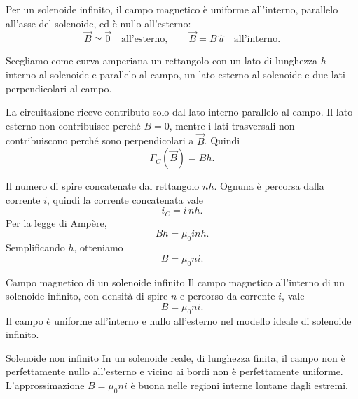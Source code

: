 \documentclass[a4paper]{article}
\begin{document}
Per un solenoide infinito, il campo magnetico è uniforme all'interno, parallelo all'asse del solenoide, ed è nullo all'esterno:
\[
    \vec{B}\simeq \vec{0}\quad \text{all'esterno},
    \qquad
    \vec{B}=B\,\hat{u}\quad \text{all'interno}.
\]

Scegliamo come curva amperiana un rettangolo con un lato di lunghezza \(h\) interno al solenoide e parallelo al campo, un lato esterno al solenoide e due lati perpendicolari al campo.

\begin{center}
\end{center}

La circuitazione riceve contributo solo dal lato interno parallelo al campo. Il lato esterno non contribuisce perché \(B=0\), mentre i lati trasversali non contribuiscono perché sono perpendicolari a \(\vec{B}\). Quindi
\[
    \Gamma_C(\vec{B})=Bh.
\]

Il numero di spire concatenate dal rettangolo  \(nh\). Ognuna è percorsa dalla corrente \(i\), quindi la corrente concatenata vale
\[
    i_C=i\,nh.
\]
Per la legge di Ampère,
\[
    Bh=\mu_0 i nh.
\]
Semplificando \(h\), otteniamo
\[
    B=\mu_0 n i.
\]

\begin{snippettheorem}{Campo magnetico di un solenoide infinito}
    Il campo magnetico all'interno di un solenoide infinito, con densità di spire \(n\) e percorso da corrente \(i\), vale
    \[
        B=\mu_0 n i.
    \]
    Il campo è uniforme all'interno e nullo all'esterno nel modello ideale di solenoide infinito.
\end{snippettheorem}

\begin{snippetnote}{Solenoide non infinito}
    In un solenoide reale, di lunghezza finita, il campo non è perfettamente nullo all'esterno e vicino ai bordi non è perfettamente uniforme. L'approssimazione \(B=\mu_0ni\) è buona nelle regioni interne lontane dagli estremi.
\end{snippetnote}
\end{document}
